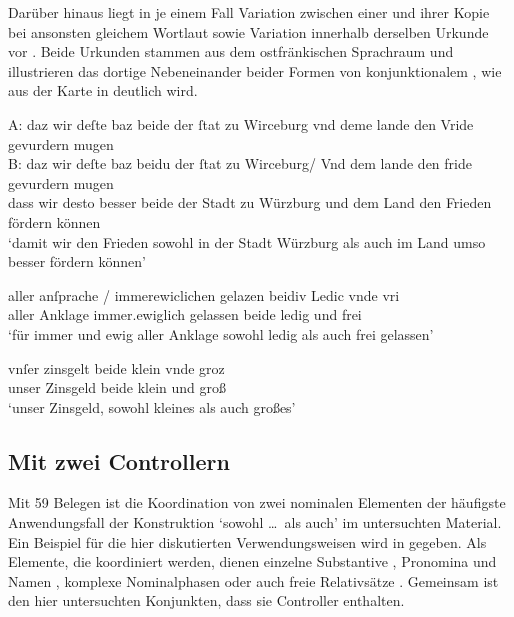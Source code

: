Darüber hinaus liegt in je einem Fall Variation zwischen einer 
und ihrer Kopie bei ansonsten gleichem Wortlaut  sowie
Variation innerhalb derselben Urkunde vor . Beide Urkunden
stammen aus dem ostfränkischen Sprachraum
und illustrieren das dortige Neben\-einander beider Formen von konjunktionalem
, wie aus der Karte in 
deutlich wird.

\begin{exe}
\ex \label{ex:intraurkvar1}
	\let\eachwordthree\eachwordtwo
	\let\eachwordtwo\eachwordone
	\glll A: daz wir deſte baz beide der ſtat zu Wirceburg vnd deme
			lande den Vride gevurdern mugen \\
		B: daz wir deſte baz beidu der ſtat zu Wirceburg/ Vnd dem lande
			den fride gevurdern mugen \\
		{} dass wir desto besser beide der Stadt zu Würzburg und dem Land
			den Frieden fördern können \\
	\trans `damit wir den Frieden sowohl in der Stadt Würzburg als
		auch im Land umso besser fördern können'
		\parencites(Nrn.~1126~AB, Würzburg, 1289)[414,36--39]{cao2}

\ex \label{ex:intraurkvar2}
	\begin{xlist}
	\ex \label{ex:intraurkvar2_1}
		\gll aller anſprache / immerewiclichen gelazen beidiv Ledic
				vnde vri \\
			aller Anklage {} immer.ewiglich gelassen beide ledig und frei \\
		\trans `für immer und ewig aller Anklage sowohl ledig als auch frei
			gelassen'
			\parencites(Nr.~2293, Bamberg, 1295)[420,23]{cao3}

	\ex \label{ex:intraurkvar2_2}
		\gll vnſer zinsgelt beide klein vnde groz \\
			unser Zinsgeld beide klein und groß \\
		\trans `unser Zinsgeld, sowohl kleines als auch großes'
			\parencites(Nr.~2293, Bamberg, 1295)[420,30]{cao3}
	\end{xlist}
\end{exe}

\subsection{Mit zwei Controllern}
\label{subsec:caokonj2ctrl}

Mit 59 Belegen ist die Koordination von zwei nominalen Elementen der häufigste
Anwendungsfall der Konstruktion  `sowohl \dots\ als
auch' im untersuchten Material. Ein Beispiel für die hier diskutierten
Verwendungsweisen wird in  gegeben. Als Elemente, die
koordiniert werden, dienen einzelne Substantive
, Pronomina und Namen , komplexe
Nominalphasen  oder auch freie
Relativsätze . Gemeinsam ist den hier
untersuchten Konjunkten, dass sie Controller enthalten.

